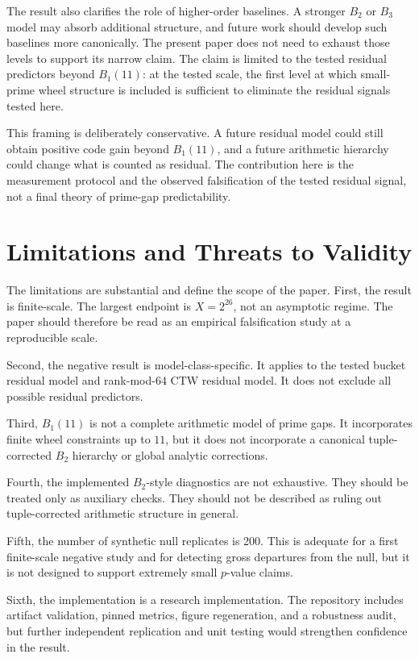 \documentclass[11pt]{article}
\begin{document}
The result also clarifies the role of higher-order baselines. A stronger $B_2$ or $B_3$ model may absorb additional structure, and future work should develop such baselines more canonically. The present paper does not need to exhaust those levels to support its narrow claim. The claim is limited to the tested residual predictors beyond $B_1(11)$: at the tested scale, the first level at which small-prime wheel structure is included is sufficient to eliminate the residual signals tested here.

This framing is deliberately conservative. A future residual model could still obtain positive code gain beyond $B_1(11)$, and a future arithmetic hierarchy could change what is counted as residual. The contribution here is the measurement protocol and the observed falsification of the tested residual signal, not a final theory of prime-gap predictability.

\section{Limitations and Threats to Validity}

The limitations are substantial and define the scope of the paper. First, the result is finite-scale. The largest endpoint is $X=2^{26}$, not an asymptotic regime. The paper should therefore be read as an empirical falsification study at a reproducible scale.

Second, the negative result is model-class-specific. It applies to the tested bucket residual model and rank-mod-64 CTW residual model. It does not exclude all possible residual predictors.

Third, $B_1(11)$ is not a complete arithmetic model of prime gaps. It incorporates finite wheel constraints up to $11$, but it does not incorporate a canonical tuple-corrected $B_2$ hierarchy or global analytic corrections.

Fourth, the implemented $B_2$-style diagnostics are not exhaustive. They should be treated only as auxiliary checks. They should not be described as ruling out tuple-corrected arithmetic structure in general.

Fifth, the number of synthetic null replicates is 200. This is adequate for a first finite-scale negative study and for detecting gross departures from the null, but it is not designed to support extremely small $p$-value claims.

Sixth, the implementation is a research implementation. The repository includes artifact validation, pinned metrics, figure regeneration, and a robustness audit, but further independent replication and unit testing would strengthen confidence in the result.
\end{document}

